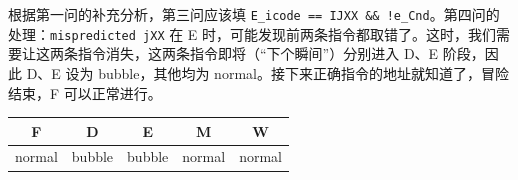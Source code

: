 \begin{problems}
        根据第一问的补充分析，第三问应该填 \verb|E_icode == IJXX && !e_Cnd|。第四问的处理：\verb|mispredicted jXX| 在 E 时，可能发现前两条指令都取错了。这时，我们需要让这两条指令消失，这两条指令即将（“下个瞬间”）分别进入 D、E 阶段，因此 D、E 设为 bubble，其他均为 normal。接下来正确指令的地址就知道了，冒险结束，F 可以正常进行。
        \begin{table}[H]
            \centering
            \begin{tabular}{|c|c|c|c|c|}
                \hline
                F & D & E & M & W \\ \hline
                normal & bubble & bubble & normal & normal \\ \hline
            \end{tabular}
        \end{table}


\end{problems}
